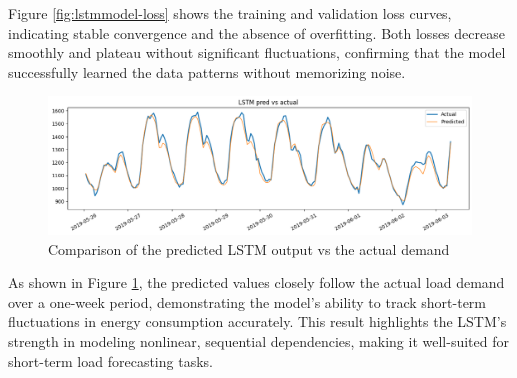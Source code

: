 Figure \ref{fig:lstmmodel-loss} shows the training and validation loss curves, indicating stable convergence and the absence of overfitting. Both losses decrease smoothly and plateau without significant fluctuations, confirming that the model successfully learned the data patterns without memorizing noise.
\begin{figure}[h!]
	\centering
	\includegraphics[width=0.5\linewidth]{Chapters/images/results/lstm_predicted_vs_actual}
	\caption{Comparison of the predicted LSTM output vs the actual demand}
	\label{fig:lstmpredictedvsactual}
\end{figure}
As shown in Figure \ref{fig:lstmpredictedvsactual}, the predicted values closely follow the actual load demand over a one-week period, demonstrating the model’s ability to track short-term fluctuations in energy consumption accurately. This result highlights the LSTM’s strength in modeling nonlinear, sequential dependencies, making it well-suited for short-term load forecasting tasks.

